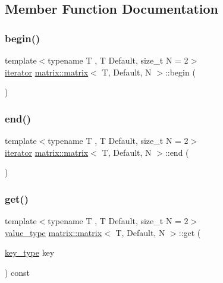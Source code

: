 \subsection{Member Function Documentation}
\mbox{\label{structmatrix_1_1matrix_a3b7a440d3593bf1bcd0719fa76128064}} 
\subsubsection{\texorpdfstring{begin()}{begin()}}
{\footnotesize\ttfamily template$<$typename T , T Default, size\+\_\+t N = 2$>$ \\
\hyperlink{structmatrix_1_1matrix_1_1iterator}{iterator} \hyperlink{structmatrix_1_1matrix}{matrix\+::matrix}$<$ T, Default, N $>$\+::begin (\begin{DoxyParamCaption}{ }\end{DoxyParamCaption})\hspace{0.3cm}{\ttfamily [inline]}}

\mbox{\label{structmatrix_1_1matrix_a8cf9448267d3ebbe15bb606b68440952}} 
\subsubsection{\texorpdfstring{end()}{end()}}
{\footnotesize\ttfamily template$<$typename T , T Default, size\+\_\+t N = 2$>$ \\
\hyperlink{structmatrix_1_1matrix_1_1iterator}{iterator} \hyperlink{structmatrix_1_1matrix}{matrix\+::matrix}$<$ T, Default, N $>$\+::end (\begin{DoxyParamCaption}{ }\end{DoxyParamCaption})\hspace{0.3cm}{\ttfamily [inline]}}

\mbox{\label{structmatrix_1_1matrix_a312aeb3131a45703593dd29558dc54da}} 
\subsubsection{\texorpdfstring{get()}{get()}}
{\footnotesize\ttfamily template$<$typename T , T Default, size\+\_\+t N = 2$>$ \\
\hyperlink{structmatrix_1_1matrix_ab940e7a84942339cdee7c0f0d3bd8ef9}{value\+\_\+type} \hyperlink{structmatrix_1_1matrix}{matrix\+::matrix}$<$ T, Default, N $>$\+::get (\begin{DoxyParamCaption}\item[{\hyperlink{structmatrix_1_1matrix_af7b5498ac1b615cb9ef51bd185a2557e}{key\+\_\+type}}]{key }\end{DoxyParamCaption}) const\hspace{0.3cm}{\ttfamily [inline]}}

